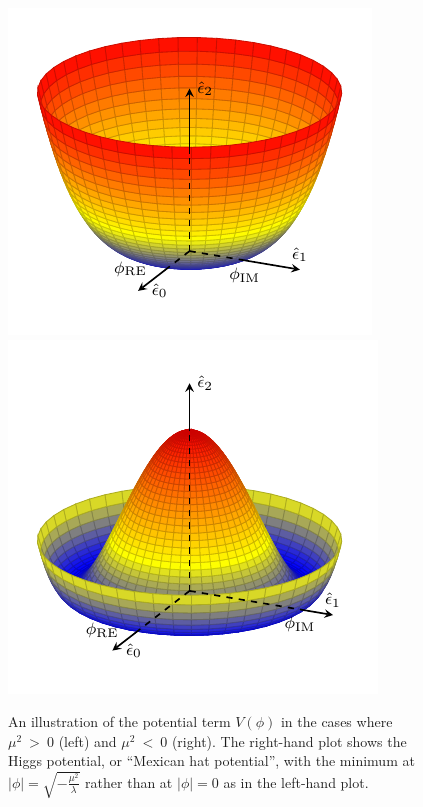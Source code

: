 \begin{figure}[htbp]
  \centering
  \includegraphics[width=.48\textwidth]{figs/theory/higgspotential_greater0}
  \includegraphics[width=.48\textwidth]{figs/theory/higgspotential}
  \caption{An illustration of the potential term $V(\phi)$ in the cases where $\mu^2~>~0$ (left) and $\mu^2~<~0$ (right).  The right-hand plot shows the Higgs potential, or ``Mexican hat potential'', with the minimum at $|\phi| = \sqrt{-\frac{\mu^2}{\lambda}}$ rather than at $|\phi| = 0$ as in the left-hand plot.}
  \label{fig:mexican_hat}
\end{figure}

